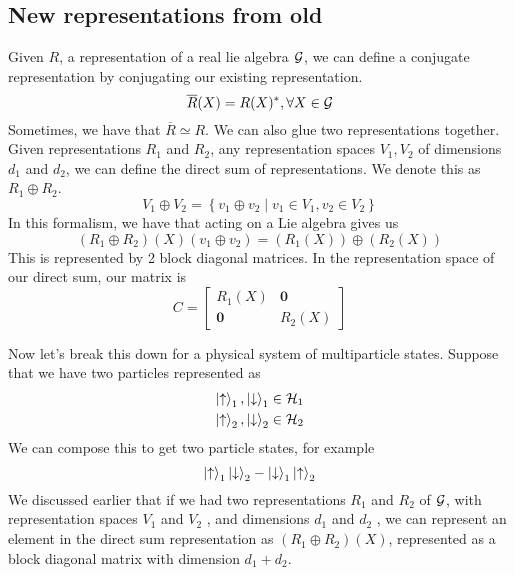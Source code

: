 \subsection{New representations from old} 
Given $ R $, a representation of a real lie algebra $ \mathcal{ G } $, we can 
define a conjugate representation by conjugating our existing representation. 
\[
	\overline{R } ( X) = R( X) ^ * , \forall X \in \mathcal{ G }
\]  Sometimes, we have that $ \overline{R } \simeq R $. 
We can also glue two representations together. 
Given representations $ R_1 $ and $ R_2 $, any representation 
spaces $ V _ 1 , V _ 2 $ of dimensions $ d_ 1 $ and $ d _  2$, we
can define the direct sum of representations. 
We denote this as $ R_1 \oplus R_2 $. 
 \[
 V _ 1 \oplus V_ 2 = \left\{  v_1 \oplus v_ 2 \mid v_ 1 \in V_1 , v_2 \in V _ 2 \right\} 
\] In this formalism, we have that acting on a Lie algebra 
gives us 
\[
 ( R_ 1 \oplus R_ 2 ) ( X) ( v_ 1 \oplus v_ 2 )  = ( R _ 1 ( X) ) \oplus ( R_ 2 ( X)) 
\] This is represented by 2 block diagonal matrices. In 
the representation space of our direct sum, our matrix is 
\[
C=
\left[
\begin{array}{c|c}
	R_1 ( X)  & \mathbf{ 0 }  \\
\hline
	\mathbf{ 0 }  & R_ 2 ( X) 
\end{array}
\right]
\]

Now let's break this down for a physical system of multiparticle states. 
Suppose that we have two particles represented as 
\begin{align*}
	\ket{ \uparrow } _ 1 , \ket{ \downarrow } _ 1 &  \in \mathcal{ H } _ 1 \\
	\ket{ \uparrow } _ 2 , \ket{ \downarrow } _ 2 & \in \mathcal{H } _ 2
\end{align*}
We can compose this to get two particle states, 
for example 
\[
	\ket{ \uparrow } _ 1 \ket{ \downarrow } _ 2 - \ket{ \downarrow } _ 1 \ket{ \uparrow } _ 2 
\] We discussed earlier that if we had 
two representations $ R_ 1 $ and $ R _ 2 $ of $ \mathcal{ G }$, 
with representation spaces $ V _ 1 $ and $ V _ 2 $ , and 
dimensions $ d_ 1 $ and $ d_ 2 $ , we can represent 
an element in the direct sum representation as 
$ ( R _ 1 \oplus R _ 2 ) ( X) $, represented as a block 
diagonal matrix with dimension  $ d_1 + d_2 $.  


